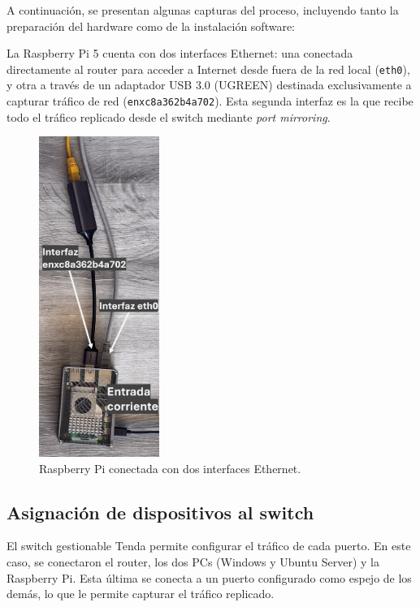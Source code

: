 \documentclass[11pt,a4paper,twoside]{report}
\begin{document}
A continuación, se presentan algunas capturas del proceso, incluyendo tanto la preparación del hardware como de la instalación software:\newline

La Raspberry Pi 5 cuenta con dos interfaces Ethernet: una conectada directamente al router para acceder a Internet desde fuera de la red local (\texttt{eth0}), y otra a través de un adaptador USB 3.0 (UGREEN) destinada exclusivamente a capturar tráfico de red (\texttt{enxc8a362b4a702}). Esta segunda interfaz es la que recibe todo el tráfico replicado desde el switch mediante \textit{port mirroring}.

\begin{figure}[H]
	\centering
	\includegraphics[width=0.35\textwidth]{pruebas_config/1-1.JPG}
	\caption{Raspberry Pi conectada con dos interfaces Ethernet.}
\end{figure}

\pagebreak

\subsection*{Asignación de dispositivos al switch}

El switch gestionable Tenda permite configurar el tráfico de cada puerto. En este caso, se conectaron el router, los dos PCs (Windows y Ubuntu Server) y la Raspberry Pi. Esta última se conecta a un puerto configurado como espejo de los demás, lo que le permite capturar el tráfico replicado.
\end{document}
